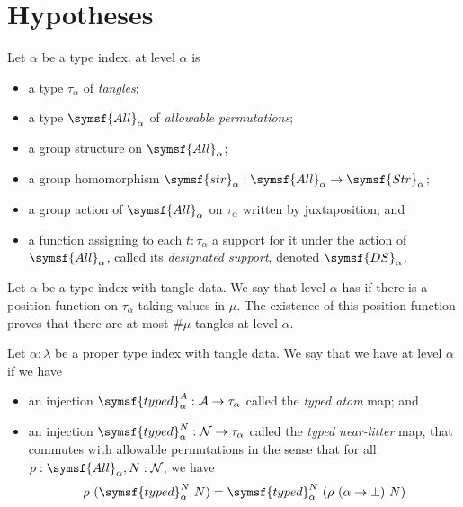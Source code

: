 \section{Hypotheses}

\begin{definition}
    Let \( \alpha \) be a type index.
     at level \( \alpha \) is
    \begin{itemize}
        \item a type \( \tau_\alpha \) of \emph{tangles};
        \item a type \( \symsf{All}_\alpha \) of \emph{allowable permutations};
        \item a group structure on \( \symsf{All}_\alpha \);
        \item a group homomorphism \( \symsf{str}_\alpha : \symsf{All}_\alpha \to \symsf{Str}_\alpha \);
        \item a group action of \( \symsf{All}_\alpha \) on \( \tau_\alpha \) written by juxtaposition; and
        \item a function assigning to each \( t : \tau_\alpha \) a support for it under the action of \( \symsf{All}_\alpha \), called its \emph{designated support}, denoted \( \symsf{DS}_\alpha \).
    \end{itemize}
\end{definition}
\begin{definition}
    Let \( \alpha \) be a type index with tangle data.
    We say that level \( \alpha \) has  if there is a position function on \( \tau_\alpha \) taking values in \( \mu \).
    The existence of this position function proves that there are at most \( \#\mu \) tangles at level \( \alpha \).
\end{definition}
\begin{definition}
    Let \( \alpha : \lambda \) be a proper type index with tangle data.
    We say that we have  at level \( \alpha \) if we have
    \begin{itemize}
        \item an injection \( \symsf{typed}^A_\alpha : \mathcal A \to \tau_\alpha \) called the \emph{typed atom} map; and
        \item an injection \( \symsf{typed}^N_\alpha : \mathcal N \to \tau_\alpha \) called the \emph{typed near-litter} map, that commutes with allowable permutations in the sense that for all \( \rho : \symsf{All}_\alpha, N : \mathcal N \), we have
        \[ \rho\ (\symsf{typed}^N_\alpha\ N) = \symsf{typed}^N_\alpha\ (\rho\ (\alpha \to \bot)\ N) \]
    \end{itemize}
\end{definition}
